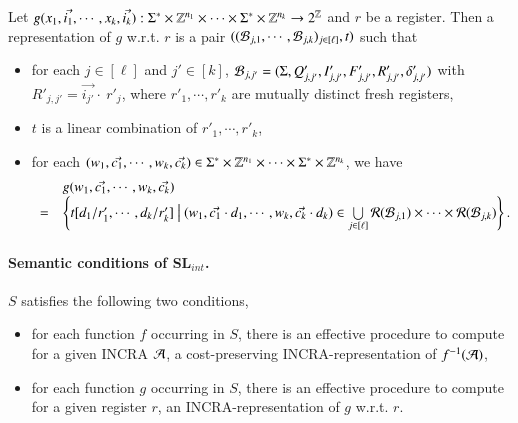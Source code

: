 \documentclass[sigplan,review,anonymous]{acmart}\settopmatter{printfolios=true,printccs=false,printacmref=false}
\begin{document}
\begin{definition}
	Let $g(x_1, \vec{i_1}, \cdots, x_k, \vec{i_k}): \Sigma^* \times \mathbb{Z}^{n_1} \times \cdots \times \Sigma^* \times \mathbb{Z}^{n_k} \rightarrow 2^{\mathbb{Z}}$ and $r$ be a register. Then a representation of $g$ w.r.t. $r$ is a pair $((\mathcal{B}_{j, 1}, \cdots, \mathcal{B}_{j, k})_{j \in [\ell]}, t)$ such that 
	\begin{itemize}
		\item for each $j \in [\ell]$ and $j' \in [k]$, $\mathcal{B}_{j, j'} = (\Sigma, Q'_{j, j'}, I'_{j,j'}, F'_{j,j'}, R'_{j,j'}, \delta'_{j,j'})$ with $R'_{j,j'} = \vec{i_{j'}} \cdot\ r'_j$, where $r'_1, \cdots, r'_k$ are mutually distinct fresh registers,
		\item $t$ is a linear combination of $r'_{1}, \cdots, r'_{k}$,  
		\item for each $(w_1,\vec{c_1}, \cdots, w_k, \vec{c_k}) \in \Sigma^* \times \mathbb{Z}^{n_1} \times \cdots \times \Sigma^* \times \mathbb{Z}^{n_k}$, we have 
		\[
		\begin{array}{ l l }
		& g(w_1,\vec{c_1}, \cdots, w_k, \vec{c_k}) \\
		= &
		\left\{t[d_1/r'_1,\cdots, d_k/r'_k]\ \big\vert\ (w_1,\vec{c_1} \cdot d_1, \cdots, w_k, \vec{c_k} \cdot d_k) \in \bigcup \limits_{j \in [\ell]} \mathcal{R}(\mathcal{B}_{j,1}) \times \cdots \times \mathcal{R}(\mathcal{B}_{j,k})\right\}.
		\end{array}
		\]
	\end{itemize}
\end{definition}

\paragraph*{Semantic conditions of SL$_{int}$.} 
$S$ satisfies the following two conditions,
\begin{itemize}
	\item for each function $f$ occurring in $S$, there is an effective procedure to compute for a given INCRA $\mathcal{A}$, a cost-preserving INCRA-representation of $f^{-1}(\mathcal{A})$, 
	\item for each function $g$ occurring in $S$, there is an effective procedure to compute for a given register $r$, an INCRA-representation of $g$ w.r.t. $r$.
\end{itemize}
\end{document}
